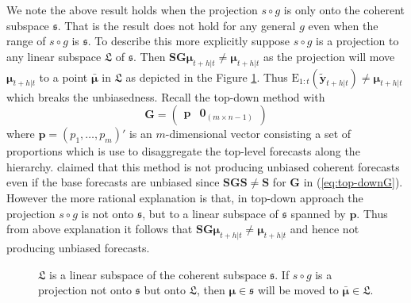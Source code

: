 \documentclass[12pt]{article}
\def\E{\text{E}}
\theoremstyle{definition}
\begin{document}
	We note the above result holds when the projection $s\circ g$ is only onto the coherent subspace $\mathfrak{s}$. That is the result does not hold for any general $g$ even when the range of $s\circ g$ is $\mathfrak{s}$. To describe this more explicitly suppose $s\circ g$ is a projection to any linear subspace $\mathfrak{L}$ of $\mathfrak{s}$. Then $\bm{S}\bm{G}\bm{\mu}_{t+h|t} \ne \bm{\mu}_{t+h|t}$ as the projection will move $\bm{\mu}_{t+h|t}$ to a point $\bar{\bm{\mu}}$ in $\mathfrak{L}$ as depicted in the Figure \ref{fig:Schematic_3D}. Thus $\E_{1:t}(\tilde{\bm{y}}_{t+h|t}) \ne \bm{\mu}_{t+h|t}$ which breaks the unbiasedness. Recall the top-down method \citep{Gross1990} with 
	\begin{equation}\label{eq:top-downG}
	\bm{G}=\begin{pmatrix}
	\bm{p} & \bm{0}_{(m \times n-1)}
	\end{pmatrix}
	\end{equation}
    where $\bm{p} = (p_1,\dots,p_m)'$ is an $m$-dimensional vector consisting a set of proportions which is use to disaggregate the top-level forecasts along the hierarchy. \cite{Hyndman2011} claimed that this method is not producing unbiased coherent forecasts even if the base forecasts are unbiased since $\bm{SGS} \ne \bm{S}$ for $\bm{G}$ in (\ref{eq:top-downG}). However the more rational explanation is that, in top-down approach the projection $s\circ g$ is not onto $\mathfrak{s}$, but to a linear subspace of $\mathfrak{s}$ spanned by $\bm{p}$. Thus from above explanation it follows that  $\bm{S}\bm{G}\bm{\mu}_{t+h|t} \ne \bm{\mu}_{t+h|t}$ and hence not producing unbiased forecasts. 
	
	
	\begin{figure}[!b]
		\centering
		\vspace{-0.9cm}
		\small
		\resizebox{\linewidth}{!}{
			
		}
		\caption{$\mathfrak{L}$ is a linear subspace of the coherent subspace $\mathfrak{s}$. If $s\circ g$ is a projection not onto $\mathfrak{s}$ but onto $\mathfrak{L}$, then $\bm{\mu} \in \mathfrak{s}$ will be moved to $\bar{\bm{\mu}} \in \mathfrak{L}$.}\label{fig:Schematic_3D}
	\end{figure}
	
	
	
\end{document}
